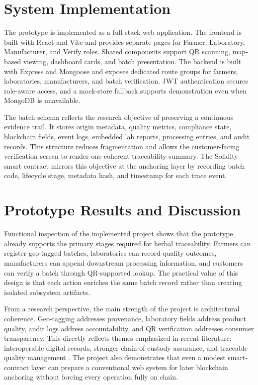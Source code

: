 \documentclass[conference]{IEEEtran}
\begin{document}
\section{System Implementation}
The prototype is implemented as a full-stack web application. The frontend is built with React and Vite and provides separate pages for Farmer, Laboratory, Manufacturer, and Verify roles. Shared components support QR scanning, map-based viewing, dashboard cards, and batch presentation. The backend is built with Express and Mongoose and exposes dedicated route groups for farmers, laboratories, manufacturers, and batch verification. JWT authentication secures role-aware access, and a mock-store fallback supports demonstration even when MongoDB is unavailable.

The batch schema reflects the research objective of preserving a continuous evidence trail. It stores origin metadata, quality metrics, compliance state, blockchain fields, event logs, embedded lab reports, processing entries, and audit records. This structure reduces fragmentation and allows the customer-facing verification screen to render one coherent traceability summary. The Solidity smart contract mirrors this objective at the anchoring layer by recording batch code, lifecycle stage, metadata hash, and timestamp for each trace event.

\section{Prototype Results and Discussion}
Functional inspection of the implemented project shows that the prototype already supports the primary stages required for herbal traceability. Farmers can register geo-tagged batches, laboratories can record quality outcomes, manufacturers can append downstream processing information, and customers can verify a batch through QR-supported lookup. The practical value of this design is that each action enriches the same batch record rather than creating isolated subsystem artifacts.

From a research perspective, the main strength of the project is architectural coherence. Geo-tagging addresses provenance, laboratory fields address product quality, audit logs address accountability, and QR verification addresses consumer transparency. This directly reflects themes emphasized in recent literature: interoperable digital records, stronger chain-of-custody assurance, and traceable quality management \cite{b1,b2,b3,b10,b11}. The project also demonstrates that even a modest smart-contract layer can prepare a conventional web system for later blockchain anchoring without forcing every operation fully on chain.
\end{document}
